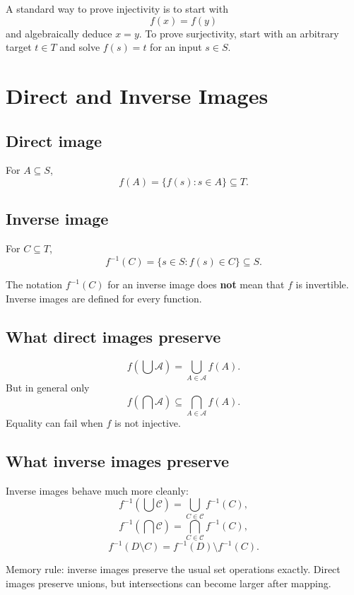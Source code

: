 \documentclass[11pt,a4paper]{article}
\begin{document}
\begin{exambox}
A standard way to prove injectivity is to start with
\[
f(x)=f(y)
\]
and algebraically deduce $x=y$. To prove surjectivity, start with an arbitrary target $t\in T$ and solve $f(s)=t$ for an input $s\in S$.
\end{exambox}

\section{Direct and Inverse Images}

\subsection{Direct image}
For $A\subseteq S$,
\[
f(A)=\{f(s):s\in A\}\subseteq T.
\]

\subsection{Inverse image}
For $C\subseteq T$,
\[
f^{-1}(C)=\{s\in S:f(s)\in C\}\subseteq S.
\]

\begin{trapbox}
The notation $f^{-1}(C)$ for an inverse image does \textbf{not} mean that $f$ is invertible. Inverse images are defined for every function.
\end{trapbox}

\subsection{What direct images preserve}
\[
f\left(\bigcup \mathcal A\right)=\bigcup_{A\in\mathcal A}f(A).
\]
But in general only
\[
f\left(\bigcap\mathcal A\right)\subseteq\bigcap_{A\in\mathcal A}f(A).
\]
Equality can fail when $f$ is not injective.

\subsection{What inverse images preserve}
Inverse images behave much more cleanly:
\[
f^{-1}\left(\bigcup\mathcal C\right)=\bigcup_{C\in\mathcal C}f^{-1}(C),
\]
\[
f^{-1}\left(\bigcap\mathcal C\right)=\bigcap_{C\in\mathcal C}f^{-1}(C),
\]
\[
f^{-1}(D\setminus C)=f^{-1}(D)\setminus f^{-1}(C).
\]

\begin{keybox}
Memory rule: inverse images preserve the usual set operations exactly. Direct images preserve unions, but intersections can become larger after mapping.
\end{keybox}
\end{document}
